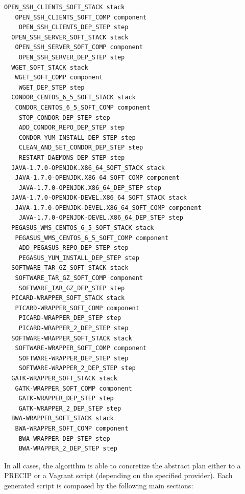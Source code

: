 \begin{lstlisting}[caption={Abstract deployment plan of the SoyKB WF},label={lst:plan-soykb}]
  OPEN_SSH_CLIENTS_SOFT_STACK stack
   OPEN_SSH_CLIENTS_SOFT_COMP component
    OPEN_SSH_CLIENTS_DEP_STEP step
  OPEN_SSH_SERVER_SOFT_STACK stack
   OPEN_SSH_SERVER_SOFT_COMP component
    OPEN_SSH_SERVER_DEP_STEP step
  WGET_SOFT_STACK stack
   WGET_SOFT_COMP component
    WGET_DEP_STEP step
  CONDOR_CENTOS_6_5_SOFT_STACK stack
   CONDOR_CENTOS_6_5_SOFT_COMP component
    STOP_CONDOR_DEP_STEP step
    ADD_CONDOR_REPO_DEP_STEP step
    CONDOR_YUM_INSTALL_DEP_STEP step
    CLEAN_AND_SET_CONDOR_DEP_STEP step
    RESTART_DAEMONS_DEP_STEP step
  JAVA-1.7.0-OPENJDK.X86_64_SOFT_STACK stack
   JAVA-1.7.0-OPENJDK.X86_64_SOFT_COMP component
    JAVA-1.7.0-OPENJDK.X86_64_DEP_STEP step
  JAVA-1.7.0-OPENJDK-DEVEL.X86_64_SOFT_STACK stack
   JAVA-1.7.0-OPENJDK-DEVEL.X86_64_SOFT_COMP component
    JAVA-1.7.0-OPENJDK-DEVEL.X86_64_DEP_STEP step
  PEGASUS_WMS_CENTOS_6_5_SOFT_STACK stack
   PEGASUS_WMS_CENTOS_6_5_SOFT_COMP component
    ADD_PEGASUS_REPO_DEP_STEP step
    PEGASUS_YUM_INSTALL_DEP_STEP step
  SOFTWARE_TAR_GZ_SOFT_STACK stack
   SOFTWARE_TAR_GZ_SOFT_COMP component
    SOFTWARE_TAR_GZ_DEP_STEP step
  PICARD-WRAPPER_SOFT_STACK stack
   PICARD-WRAPPER_SOFT_COMP component
    PICARD-WRAPPER_DEP_STEP step
    PICARD-WRAPPER_2_DEP_STEP step
  SOFTWARE-WRAPPER_SOFT_STACK stack
   SOFTWARE-WRAPPER_SOFT_COMP component
    SOFTWARE-WRAPPER_DEP_STEP step
    SOFTWARE-WRAPPER_2_DEP_STEP step
  GATK-WRAPPER_SOFT_STACK stack
   GATK-WRAPPER_SOFT_COMP component
    GATK-WRAPPER_DEP_STEP step
    GATK-WRAPPER_2_DEP_STEP step
  BWA-WRAPPER_SOFT_STACK stack
   BWA-WRAPPER_SOFT_COMP component
    BWA-WRAPPER_DEP_STEP step
    BWA-WRAPPER_2_DEP_STEP step
\end{lstlisting}

In all cases, the algorithm is able to concretize the abstract plan either to a PRECIP or a Vagrant script (depending on the specified provider). Each generated script is composed by the following main sections:

